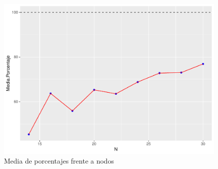 \documentclass[twoside,a4paper,openright,12pt,tikz]{book}
\begin{document}
\begin{figure}[h!]
\centering
\includegraphics[scale=0.7]{plot11}
\caption{Media de porcentajes frente a nodos}
\end{figure}
\end{document}
